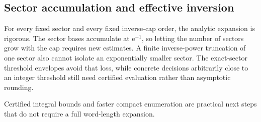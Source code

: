 \documentclass[11pt,letterpaper]{article}
\theoremstyle{remark}\newtheorem{remark}[theorem]{Remark}
\newcommand{\ee}{\mathrm e}
\begin{document}
\subsection{Sector accumulation and effective inversion}
For every fixed sector and every fixed inverse-cap order, the analytic expansion is rigorous. The sector bases accumulate at $\ee^{-1}$, so letting the number of sectors grow with the cap requires new estimates. A finite inverse-power truncation of one sector also cannot isolate an exponentially smaller sector. The exact-sector threshold envelopes avoid that loss, while concrete decisions arbitrarily close to an integer threshold still need certified evaluation rather than asymptotic rounding.

Certified integral bounds and faster compact enumeration are practical next steps that do not require a full word-length expansion.
\end{document}
